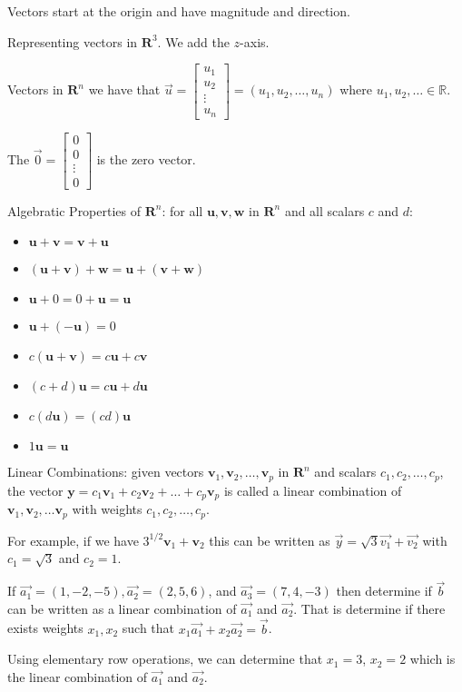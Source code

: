 \documentclass[../linalg.tex]{subfiles}
\begin{document}
Vectors start at the origin and have magnitude and direction.

Representing vectors in $\textbf{R}^3$. We add the $z$-axis.

Vectors in $\textbf{R}^n$ we have that $\vec{u}=\begin{bmatrix}
    u_1\\ u_2 \\ \vdots \\u_n 
\end{bmatrix}=(u_1,u_2,\dots,u_n)$ where $u_1,u_2,\dots \in \mathbb{R}$.

The $\vec{0}=\begin{bmatrix}
    0\\0\\ \vdots\\0
\end{bmatrix}$ is the zero vector.

Algebratic Properties of $\textbf{R}^n$: for all $\textbf{u}, \textbf{v}, \textbf{w}$ in $\textbf{R}^n$ and all scalars $c$ and $d$:
\begin{itemize}
    \item $\textbf{u}+\textbf{v}=\textbf{v}+\textbf{u}$
    \item $(\textbf{u}+\textbf{v})+\textbf{w}=\textbf{u}+(\textbf{v}+\textbf{w})$
    \item $\textbf{u}+0=0+\textbf{u}=\textbf{u}$
    \item $\textbf{u}+(-\textbf{u})=0$
    \item $c(\textbf{u}+\textbf{v})=c\textbf{u}+c\textbf{v}$
    \item $(c+d)\textbf{u}=c\textbf{u}+d\textbf{u}$
    \item $c(d\textbf{u})=(cd)\textbf{u}$
    \item $1\textbf{u}=\textbf{u}$
\end{itemize}

Linear Combinations: given vectors $\textbf{v}_1,\textbf{v}_2,\dots,\textbf{v}_p$ in $\textbf{R}^n$ and scalars 
$c_1,c_2,\dots, c_p$, the vector $\textbf{y}=c_1\textbf{v}_1+c_2\textbf{v}_2+\dots+c_p\textbf{v}_p$ is called a linear combination of 
$\textbf{v}_1,\textbf{v}_2,\dots \textbf{v}_p$ with weights $c_1,c_2,\dots, c_p$.

For example, if we have $3^{1/2}\textbf{v}_1+\textbf{v}_2$ this can be written as $\vec{y}=\sqrt{3}\vec{v_1}+\vec{v_2}$ with $c_1=\sqrt{3}$ and $c_2=1$.

\begin{example}
    If $\vec{a_1}=(1,-2,-5), \vec{a_2}=(2,5,6)$, and $\vec{a_3}=(7,4,-3)$ then determine if $\vec{b}$ can be written as a linear combination of $\vec{a_1}$ and $\vec{a_2}$. That is determine if there exists weights $x_1,x_2$ such that $x_1\vec{a_1}+x_2\vec{a_2}=\vec{b}$.

    Using elementary row operations, we can determine that $x_1=3$, $x_2=2$ which is the linear combination of $\vec{a_1}$ and $\vec{a_2}$.

\end{example}
\end{document}
